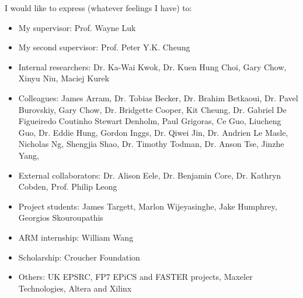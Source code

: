 
\cleardoublepage

{}

\begin{acknowledgements}

I would like to express (whatever feelings I have) to:

\begin{itemize}
 \item My supervisor: Prof. Wayne Luk
 \vspace*{3mm}
 \item My second supervisor: Prof. Peter Y.K. Cheung 
 \vspace*{3mm}
 \item Internal researchers: Dr. Ka-Wai Kwok, Dr. Kuen Hung Choi, Gary Chow, Xinyu Niu, Maciej Kurek
 \vspace*{3mm}
 \item Colleagues: 
 James Arram, 
 Dr. Tobias Becker, 
 Dr. Brahim Betkaoui, 
 Dr. Pavel Burovskiy, 
 Gary Chow, 
 Dr. Bridgette Cooper, 
 Kit Cheung, 
 Dr. Gabriel De Figueiredo Coutinho
 Stewart Denholm, 
 Paul Grigoras, 
 Ce Guo, 
 Liucheng Guo, 
 Dr. Eddie Hung, 
 Gordon Inggs, 
 Dr. Qiwei Jin, 
 Dr. Andrien Le Masle, 
 Nicholas Ng, 
 Shengjia Shao, 
 Dr. Timothy Todman, 
 Dr. Anson Tse, 
 Jinzhe Yang, 
 \vspace*{3mm}
 \item External collaborators: Dr. Alison Eele, Dr. Benjamin Core, Dr. Kathryn Cobden, Prof. Philip Leong
 \vspace*{3mm}
 \item Project students: James Targett, Marlon Wijeyasinghe, Jake Humphrey, Georgios Skouroupathis
 \vspace*{3mm}
 \item ARM internship: William Wang
 \vspace*{3mm}
 \vspace*{3mm}
 \item Scholarship: Croucher Foundation
 \vspace*{3mm}
 \item Others: UK EPSRC, FP7 EPiCS and FASTER projects, Maxeler Technologies, Altera and Xilinx
\end{itemize}

\end{acknowledgements}
